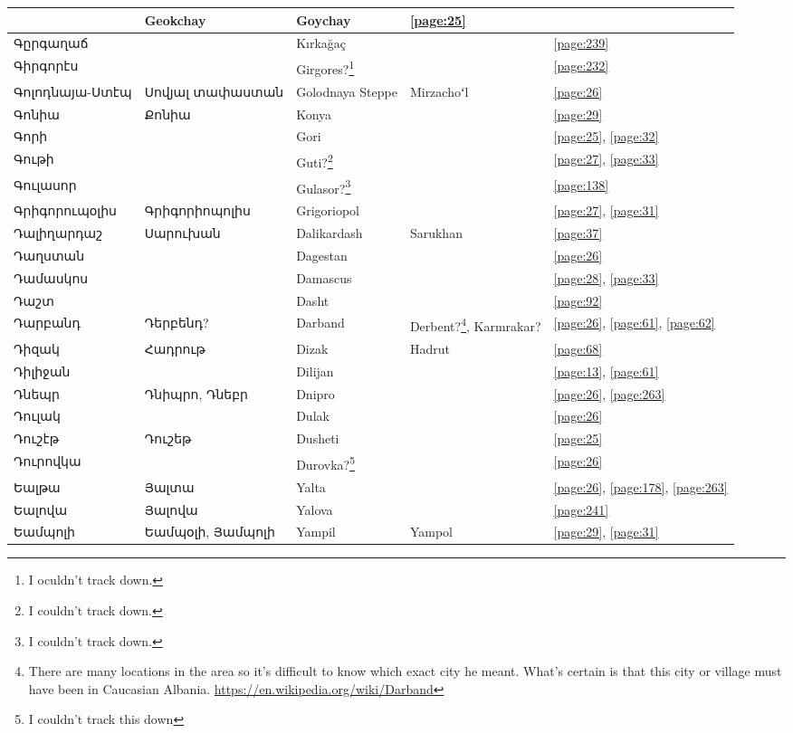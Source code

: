 \begin{center}
\begin{longtable}{|p{}|p{3cm}|p{3cm}|p{2cm}|p{3cm}|}
&{Geokchay} &Goychay &\ref{page:25}\\ \hline
Գըրգաղաճ& 
&Kırkağaç & &\ref{page:239}\\ \hline
Գիրգորէս&  
&{Girgores}?\footnote{I oculdn't track down.} & &\ref{page:232}\\ \hline
Գոլոդնայա-Ստէպ& Սովյալ տափաստան& 
Golodnaya Steppe& Mirzachoʻl&\ref{page:26}\\ \hline
Գոնիա& Քոնիա& 
{Konya}& &\ref{page:29}\\ \hline
Գորի& & 
{Gori}& &\ref{page:25}, \ref{page:32}\\ \hline
Գութի& &
{Guti?}\footnote{I couldn't track down.}&  &\ref{page:27}, \ref{page:33}\\ \hline
Գուլասոր& &
 Gulasor?\footnote{I couldn't track down.}& &\ref{page:138}\\ \hline
Գրիգորուպօլիս&Գրիգորիոպոլիս
& {Grigoriopol}& &\ref{page:27}, \ref{page:31}\\ \hline
Դալիղարդաշ&Սարուխան
& {Dalikardash}& Sarukhan&\ref{page:37}\\ \hline
Դաղստան& & 
{Dagestan}& &\ref{page:26}\\ \hline
Դամասկոս& &
Damascus& &\ref{page:28}, \ref{page:33}\\ \hline
Դաշտ& & 
{Dasht}& &\ref{page:92}\\ \hline
Դարբանդ& Դերբենդ?&
{Darband}&Derbent?\footnote{There are many locations in the area so it's difficult to know which exact city he meant. What's certain is that this city or village must have been in Caucasian Albania. \url{https://en.wikipedia.org/wiki/Darband}}, Karmrakar? &\ref{page:26}, \ref{page:61}, \ref{page:62}\\ \hline
Դիզակ& Հադրութ& 
Dizak &Hadrut &\ref{page:68}\\ \hline
Դիլիջան& &
Dilijan& &\ref{page:13}, \ref{page:61}\\ \hline
Դնեպր&Դնիպրո, Դնեբր & 
{Dnipro}& &\ref{page:26}, \ref{page:263}\\ \hline
Դուլակ& &
{Dulak}& &\ref{page:26}\\ \hline
Դուշէթ& Դուշեթ
&{Dusheti} & &\ref{page:25}\\ \hline
Դուրովկա& 
&{Durovka?}\footnote{I couldn't track this down} & &\ref{page:26}\\ \hline
Եալթա& Յալտա&{Yalta} 
& &\ref{page:26}, \ref{page:178}, \ref{page:263}\\ \hline
Եալովա& Յալովա
&{Yalova} & &\ref{page:241}\\ \hline
Եամպոլի& Եամպօլի, Յամպոլի&
{Yampil}&Yampol &\ref{page:29}, \ref{page:31}\\ \hline

\end{longtable}
\end{center}
